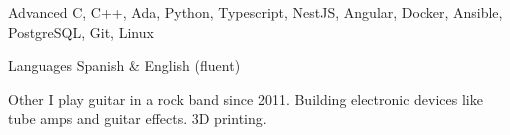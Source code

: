 
\begin{cvskills}

  \cvskill
    {Advanced}
    {C, C++, Ada, Python, Typescript, NestJS, Angular, Docker, Ansible, PostgreSQL, Git, Linux}

  \cvskill
    {Languages}
    {Spanish \& English (fluent)}

  \cvskill
    {Other}
    {I play guitar in a rock band since 2011. Building electronic devices like tube amps and guitar effects. 3D printing.}

\end{cvskills}
